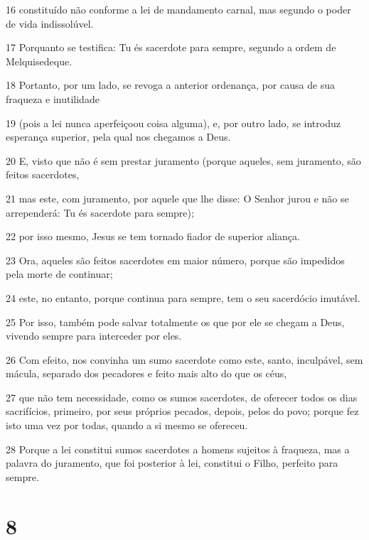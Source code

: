\par 16 constituído não conforme a lei de mandamento carnal, mas segundo o poder de vida indissolúvel.
\par 17 Porquanto se testifica: Tu és sacerdote para sempre, segundo a ordem de Melquisedeque.
\par 18 Portanto, por um lado, se revoga a anterior ordenança, por causa de sua fraqueza e inutilidade
\par 19 (pois a lei nunca aperfeiçoou coisa alguma), e, por outro lado, se introduz esperança superior, pela qual nos chegamos a Deus.
\par 20 E, visto que não é sem prestar juramento (porque aqueles, sem juramento, são feitos sacerdotes,
\par 21 mas este, com juramento, por aquele que lhe disse: O Senhor jurou e não se arrependerá: Tu és sacerdote para sempre);
\par 22 por isso mesmo, Jesus se tem tornado fiador de superior aliança.
\par 23 Ora, aqueles são feitos sacerdotes em maior número, porque são impedidos pela morte de continuar;
\par 24 este, no entanto, porque continua para sempre, tem o seu sacerdócio imutável.
\par 25 Por isso, também pode salvar totalmente os que por ele se chegam a Deus, vivendo sempre para interceder por eles.
\par 26 Com efeito, nos convinha um sumo sacerdote como este, santo, inculpável, sem mácula, separado dos pecadores e feito mais alto do que os céus,
\par 27 que não tem necessidade, como os sumos sacerdotes, de oferecer todos os dias sacrifícios, primeiro, por seus próprios pecados, depois, pelos do povo; porque fez isto uma vez por todas, quando a si mesmo se ofereceu.
\par 28 Porque a lei constitui sumos sacerdotes a homens sujeitos à fraqueza, mas a palavra do juramento, que foi posterior à lei, constitui o Filho, perfeito para sempre.

\chapter{8}

